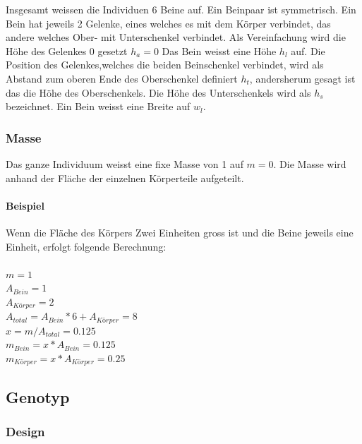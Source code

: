       Insgesamt weissen die Individuen 6 Beine auf. Ein Beinpaar ist symmetrisch. Ein Bein hat jeweils 2 Gelenke,
      eines welches es mit dem Körper verbindet,
      das andere welches Ober- mit Unterschenkel verbindet.
      Als Vereinfachung wird die Höhe des Gelenkes 0 gesetzt  \(h_{a} = 0\)
      Das Bein weisst eine Höhe \(h_{l}\) auf. Die Position des Gelenkes,welches die beiden Beinschenkel verbindet,
      wird als Abstand zum oberen Ende des Oberschenkel definiert \(h_{t}\),
      andersherum gesagt ist das die Höhe des Oberschenkels.
      Die Höhe des Unterschenkels wird als \(h_{s}\) bezeichnet.
      Ein Bein weisst eine Breite auf \(w_{l}\).
      \\
      

      \subsubsection{Masse\label{subs:Masse}}

        Das ganze Individuum weisst eine fixe Masse von 1 auf \(m = 0\).
        Die Masse wird anhand der Fläche der einzelnen Körperteile aufgeteilt.
      \paragraph{Beispiel\label{par:MasseExample}}
        Wenn die Fläche des Körpers Zwei Einheiten gross ist und die Beine jeweils eine Einheit,
        erfolgt folgende Berechnung:
        \\
        \\
        \(m = 1\) \\
        \(A_{Bein} = 1\) \\
        \(A_{Körper} = 2\) \\
        \(A_{total} = A_{Bein} * 6 + A_{Körper} = 8 \) \\
        \( x = m / A_{total} = 0.125 \) \\
        \(m_{Bein} = x * A_{Bein} = 0.125\) \\
        \(m_{Körper} = x * A_{Körper} = 0.25\) \\

    \subsection{Genotyp\label{sub:Genotype}}

      \subsubsection{Design\label{subsub:GenotypeDesign}}

